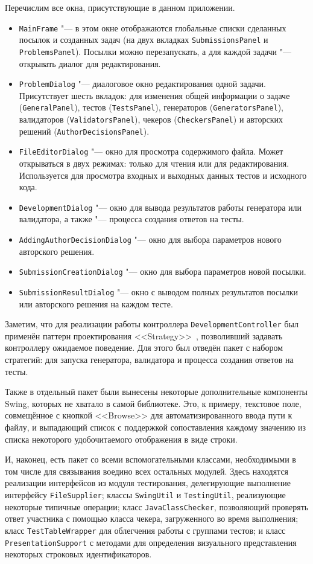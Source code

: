 Перечислим все окна, присутствующие в данном приложении.

\begin{itemize}
\item \texttt{MainFrame} "--- в этом окне отображаются глобальные списки сделанных посылок и созданных задач (на двух вкладках \texttt{Submissions\-Panel} и \texttt{Problems\-Panel}). Посылки можно перезапускать, а для каждой задачи "--- открывать диалог для редактирования.
\item \texttt{ProblemDialog} "--- диалоговое окно редактирования одной задачи. Присутствует шесть вкладок: для изменения общей информации о задаче (\texttt{General\-Panel}), тестов (\texttt{Tests\-Panel}), генераторов (\texttt{Generators\-Panel}), валидаторов (\texttt{Validators\-Panel}), чекеров (\texttt{Checkers\-Panel}) и авторских решений (\texttt{Author\-Decisions\-Panel}).
\item \texttt{FileEditorDialog} "--- окно для просмотра содержимого файла. Может открываться в двух режимах: только для чтения или для редактирования. Используется для просмотра входных и выходных данных тестов и исходного кода.
\item \texttt{DevelopmentDialog} "--- окно для вывода результатов работы генератора или валидатора, а также "--- процесса создания ответов на тесты.
\item \texttt{AddingAuthorDecisionDialog} "--- окно для выбора параметров нового авторского решения.
\item \texttt{SubmissionCreationDialog} "--- окно для выбора параметров новой посылки.
\item \texttt{SubmissionResultDialog} "--- окно с выводом полных результатов посылки или авторского решения на каждом тесте.
\end{itemize}

Заметим, что для реализации работы контроллера \texttt{Development\-Controller} был применён паттерн проектирования <<Strategy>>~\cite{gamma}, позволивший задавать контроллеру ожидаемое поведение. Для этого был отведён пакет с набором стратегий: для запуска генератора, валидатора и процесса создания ответов на тесты.

Также в отдельный пакет были вынесены некоторые дополнительные компоненты Swing, которых не хватало в самой библиотеке. Это, к примеру, текстовое поле, совмещённое с кнопкой <<Browse>> для автоматизированного ввода пути к файлу, и выпадающий список с поддержкой сопоставления каждому значению из списка некоторого удобочитаемого отображения в виде строки.

И, наконец, есть пакет со всеми вспомогательными классами, необходимыми в том числе для связывания воедино всех остальных модулей. Здесь находятся реализации интерфейсов из модуля тестирования, делегирующие выполнение интерфейсу \texttt{File\-Supplier}; классы \texttt{Swing\-Util} и \texttt{Testing\-Util}, реализующие некоторые типичные операции; класс \texttt{Java\-Class\-Checker}, позволяющий проверять ответ участника с помощью класса чекера, загруженного во время выполнения; класс \texttt{Test\-Table\-Wrapper} для облегчения работы с группами тестов; и класс \texttt{Presentation\-Support} с методами для определения визуального представления некоторых строковых идентификаторов.